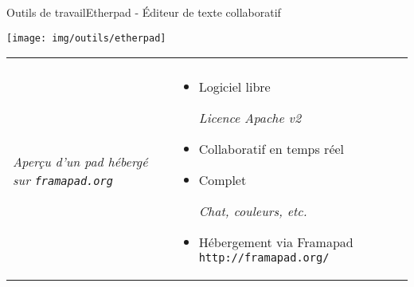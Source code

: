 \begin{frame}{Outils de travail}{Etherpad - Éditeur de texte collaboratif}
\begin{center}
	\texttt{[image: img/outils/etherpad]}\\
\end{center}
\begin{tabular}{l l}
\begin{minipage}{0.5\textwidth}\begin{center}
\texttt{[image: img/outils/etherpad\_screenshot]}\\
\textit{\tiny Aperçu d'un pad hébergé sur \texttt{framapad.org}}
\end{center}\end{minipage} & \begin{minipage}{0.5\textwidth}
\begin{itemize}
\item Logiciel libre

\textit{Licence Apache v2}
\item Collaboratif en temps réel
\item Complet

\textit{Chat, couleurs, etc.}
\item Hébergement via Framapad
\texttt{\small http://framapad.org/}
\end{itemize}
\end{minipage}
\end{tabular}
\end{frame}